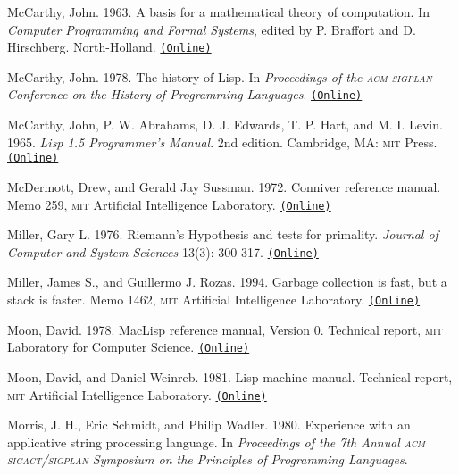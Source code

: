 \documentclass[oneside]{book}
\newcommand{\acronym}[1]{\textsc{\MakeLowercase{#1}}}
\newcommand{\code}[1]{\texttt{#1}}
\begin{document}
 \label{McCarthy 1963}
McCarthy, John.  1963.  A basis for a mathematical theory of computation.  In
\textit{Computer Programming and Formal Systems}, edited by P. Braffort and
D. Hirschberg.  North-Holland.
\href{http://innovation.it.uts.edu.au/projectjmc/articles/basis.html}{\code{(Online)}}

 \label{McCarthy 1978}
McCarthy, John.  1978.  The history of Lisp.  In \textit{Proceedings of the
\acronym{ACM} \acronym{SIGPLAN} Conference on the History of Programming
Languages}.
\href{http://innovation.it.uts.edu.au/projectjmc/articles/lisp.html}{\code{(Online)}}

 \label{McCarthy et al. 1965}
McCarthy, John, P. W. Abrahams, D. J. Edwards, T. P. Hart, and M. I.  Levin.
1965.  \textit{Lisp 1.5 Programmer's Manual}.  2nd edition.  Cambridge, MA:
\acronym{MIT} Press.
\href{http://www.softwarepreservation.org/projects/LISP/book/LISP\%201.5\%20Programmers\%20Manual.pdf/view}{\code{(Online)}}

 \label{McDermott and Sussman (1972)}
McDermott, Drew, and Gerald Jay Sussman.  1972. Conniver reference manual.
Memo 259, \acronym{MIT} Artificial Intelligence Laboratory.
\href{http://dspace.mit.edu/handle/1721.1/6203}{\code{(Online)}}

 \label{Miller 1976}
Miller, Gary L.  1976.  Riemann's Hypothesis and tests for primality.
\textit{Journal of Computer and System Sciences} 13(3): 300-317.
\href{http://www.cs.cmu.edu/~glmiller/Publications/b2hd-Mi76.html}{\code{(Online)}}

 \label{Miller and Rozas 1994}
Miller, James S., and Guillermo J. Rozas. 1994.  Garbage collection is fast,
but a stack is faster.  Memo 1462, \acronym{MIT} Artificial Intelligence
Laboratory.
\href{http://dspace.mit.edu/handle/1721.1/6622}{\code{(Online)}}

 \label{Moon 1978}
Moon, David.  1978.  MacLisp reference manual, Version 0.  Technical report,
\acronym{MIT} Laboratory for Computer Science.
\href{http://www.softwarepreservation.org/projects/LISP/MIT/Moon-MACLISP_Reference_Manual-Apr_08_1974.pdf/view}{\code{(Online)}}

 \label{Moon and Weinreb 1981}
Moon, David, and Daniel Weinreb.  1981.  Lisp machine manual.  Technical
report, \acronym{MIT} Artificial Intelligence Laboratory.
\href{http://www.unlambda.com/lmman/index.html}{\code{(Online)}}

 \label{Morris et al. 1980}
Morris, J. H., Eric Schmidt, and Philip Wadler.  1980.  Experience with an
applicative string processing language.  In \textit{Proceedings of the 7th Annual
\acronym{ACM} \acronym{SIGACT}/\acronym{SIGPLAN} Symposium on the Principles of
Programming Languages}.
\end{document}
